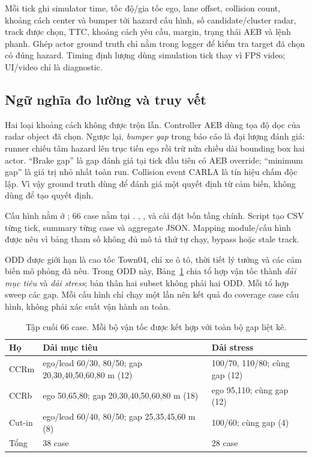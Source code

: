 \documentclass[conference]{IEEEtran}
\begin{document}
Mỗi tick ghi simulator time, tốc độ/gia tốc ego, lane offset, collision count,
khoảng cách center và bumper tới hazard cấu hình, số candidate/cluster radar,
track được chọn, TTC, khoảng cách yêu cầu, margin, trạng thái AEB và lệnh phanh.
Ghép actor ground truth chỉ nằm trong logger để kiểm tra target đã chọn có đúng
hazard. Timing định lượng dùng simulation tick thay vì FPS video; UI/video chỉ
là diagnostic.

\subsection{Ngữ nghĩa đo lường và truy vết}
Hai loại khoảng cách không được trộn lẫn. Controller AEB dùng tọa độ dọc của
radar object đã chọn. Ngược lại, \emph{bumper gap} trong báo cáo là đại lượng
đánh giá: runner chiếu tâm hazard lên trục tiến ego rồi trừ nửa chiều dài bounding
box hai actor. ``Brake gap'' là gap đánh giá tại tick đầu tiên có AEB override;
``minimum gap'' là giá trị nhỏ nhất toàn run. Collision event CARLA là tín hiệu
chấm độc lập. Vì vậy ground truth dùng để đánh giá một quyết định từ cảm biến,
không dùng để tạo quyết định.

Cấu hình nằm ở ; 66 case nằm tại
.
, ,
 và  cài đặt bốn tầng chính.
Script tạo CSV từng tick, summary từng case và aggregate JSON. Mapping module/cấu
hình được nêu vì bảng tham số không đủ mô tả thứ tự chạy, bypass hoặc stale track.

ODD được giới hạn là cao tốc Town04, chỉ xe ô tô, thời tiết lý tưởng và các cảm
biến mô phỏng đã nêu. Trong ODD này, Bảng~\ref{tab:suite} chia tổ hợp vận tốc
thành \emph{dải mục tiêu} và \emph{dải stress}; bản thân hai subset không phải
hai ODD. Mỗi tổ hợp sweep các gap. Mỗi cấu hình chỉ chạy một lần nên kết quả đo
coverage case cấu hình, không phải xác suất vận hành an toàn.

\begin{table}[t]
\caption{Tập cuối 66 case. Mỗi bộ vận tốc được kết hợp với toàn bộ gap liệt kê.}
\label{tab:suite}
\centering
\scriptsize
\begin{tabular}{p{}p{}p{}}
\toprule
Họ & Dải mục tiêu & Dải stress \\
\midrule
CCRm & ego/lead 60/30, 80/50; gap 20,30,40,50,60,80 m (12) & 100/70, 110/80; cùng gap (12) \\
CCRb & ego 50,65,80; gap 20,30,40,50,60,80 m (18) & ego 95,110; cùng gap (12) \\
Cut-in & ego/lead 60/40, 80/50; gap 25,35,45,60 m (8) & 100/60; cùng gap (4) \\
\midrule
Tổng & 38 case & 28 case \\
\bottomrule
\end{tabular}
\end{table}
\end{document}
